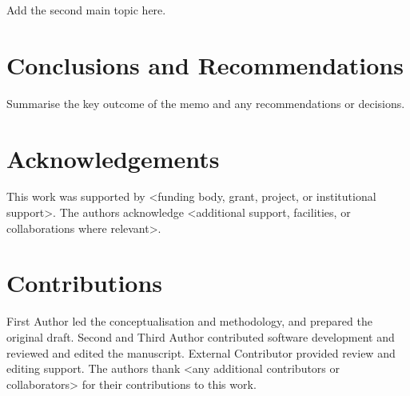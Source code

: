 \documentclass{uksrc-memo}
\begin{document}
Add the second main topic here.

\section{Conclusions and Recommendations}

Summarise the key outcome of the memo and any recommendations or decisions.

\section*{Acknowledgements}

This work was supported by <funding body, grant, project, or institutional support>. The authors acknowledge <additional support, facilities, or collaborations where relevant>.

\section*{Contributions}

First Author led the conceptualisation and methodology, and prepared the original draft. Second and Third Author contributed software development and reviewed and edited the manuscript. External Contributor provided review and editing support. The authors thank <any additional contributors or collaborators> for their contributions to this work.






\end{document}
